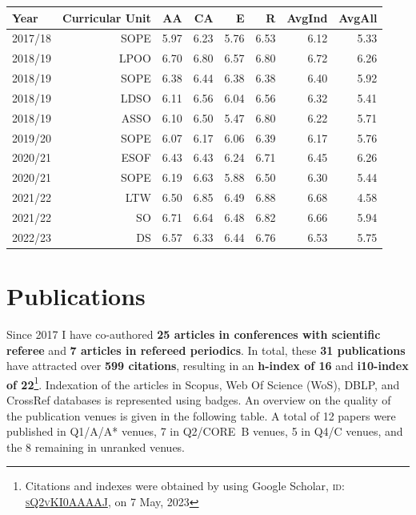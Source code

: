 \documentclass[10pt, a4paper]{article}
\begin{document}
\begin{table}[H]
    \centering
	\renewcommand{\arraystretch}{0.5}
	\begin{tabular*}{\textwidth}{l @{\extracolsep{\fill}}rrrrr|rr@{}}
		Year &         Curricular Unit     &        AA    & CA  & E & R & AvgInd & AvgAll \\\midrule
        2017/18 & SOPE & 5.97 & 6.23 & 5.76 & 6.53 & 6.12 & 5.33 \\
        2018/19 & LPOO  & 6.70  & 6.80& 6.57& 6.80& 6.72 & 6.26 \\
        2018/19 & SOPE  & 6.38 & 6.44 & 6.38 & 6.38 & 6.40 & 5.92 \\
        2018/19 & LDSO  & 6.11 & 6.56 & 6.04 & 6.56 & 6.32& 5.41 \\
        2018/19 & ASSO  &6.10 & 6.50 & 5.47 &6.80 &6.22& 5.71\\
        2019/20 & SOPE  & 6.07&6.17 &6.06 &6.39 & 6.17 & 5.76\\
        2020/21 & ESOF  & 6.43 &6.43 & 6.24& 6.71& 6.45 & 6.26 \\
        2020/21 & SOPE  & 6.19&6.63 & 5.88 &6.50 & 6.30& 5.44 \\
        2021/22 & LTW  & 6.50& 6.85& 6.49& 6.88& 6.68& 4.58\\
        2021/22 & SO  & 6.71& 6.64& 6.48& 6.82&6.66 &5.94 \\
        2022/23 & DS  & 6.57&6.33 & 6.44& 6.76& 6.53& 5.75\\
  \bottomrule
	\end{tabular*}
\end{table}

\section*{Publications}

Since 2017 I have co-authored \textbf{25 articles in conferences with scientific referee} and \textbf{7 articles in refereed periodics}. In total, these \textbf{31 publications} have attracted over \textbf{599 citations}, resulting in an \textbf{h-index of 16} and \textbf{i10-index of 22}\footnote{Citations and indexes were obtained by using Google Scholar, \textsc{id: \href{https://scholar.google.com/citations?user=sQ2vKI0AAAAJ}{sQ2vKI0AAAAJ}}, on 7 May, 2023}. Indexation of the articles in Scopus, Web Of Science (WoS), DBLP, and CrossRef databases is represented using badges. An overview on the quality of the publication venues is given in the following table. A total of 12 papers were published in Q1/A/A* venues, 7 in Q2/CORE~B venues, 5 in Q4/C venues, and the 8 remaining in unranked venues.
\end{document}
